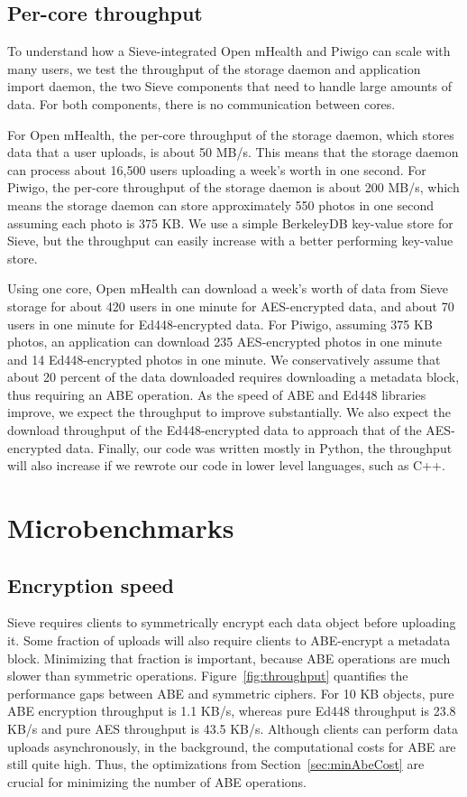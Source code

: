\subsection{Per-core throughput} To understand
how a Sieve-integrated Open mHealth and Piwigo can scale
with many users, we test the throughput of the
storage daemon and application 
import daemon, the two Sieve components 
that need to handle large amounts of
data. For both components, there is no communication
between cores.

For Open mHealth, the per-core throughput of the storage daemon,
which stores data that a user uploads, is about 50 MB/s.
This means that the storage daemon can process
about 16,500 users uploading a week's worth in one second.
For Piwigo, the per-core throughput of the storage daemon is
about 200 MB/s, which means the storage daemon can store approximately
550 photos in one second assuming each photo is 375 KB.
We use a simple BerkeleyDB key-value store for Sieve, but
the throughput can easily increase with a better performing
key-value store.

Using one core, Open mHealth can download
a week's worth of data from Sieve storage for 
about 420 users in one minute for AES-encrypted
data, and about 70 users in one minute for Ed448-encrypted data. 
For Piwigo, assuming 375 KB photos, 
an application can download 235 AES-encrypted photos in one minute
and 14 Ed448-encrypted photos in one minute. We conservatively
assume that about 20 percent of the data downloaded requires downloading
a metadata block, thus requiring an ABE operation. 
As the speed of ABE and Ed448 libraries improve, we expect the throughput to 
improve substantially. We also expect the download throughput 
of the Ed448-encrypted data to approach that of the AES-encrypted data. 
Finally, our code was written mostly in Python, the throughput
will also increase if we rewrote our code in lower level
languages, such as C++.

\section{Microbenchmarks}
\subsection{Encryption speed} Sieve requires
clients to symmetrically encrypt each data
object before uploading it. Some fraction of
uploads will also require clients to ABE-encrypt
a metadata block. Minimizing that fraction
is important, because ABE operations are much
slower than symmetric operations. Figure~\ref{fig:throughput}
quantifies the performance gaps between ABE
and symmetric ciphers. For 10 KB objects,
pure ABE encryption throughput is 1.1 KB/s,
whereas pure Ed448 throughput is 23.8 KB/s
and pure AES throughput is 43.5 KB/s.
Although clients can perform data uploads
asynchronously, in the background, the
computational costs for ABE are still quite
high. Thus, the optimizations from
Section~\ref{sec:minAbeCost} are crucial
for minimizing the number of ABE operations.

